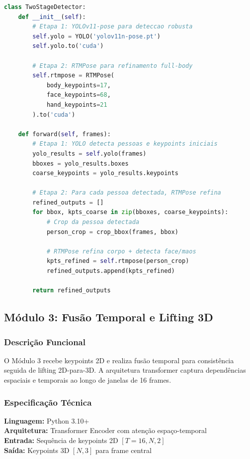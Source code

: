 \documentclass[12pt, a4paper]{article}
\begin{document}
\begin{lstlisting}[language=Python, caption=Módulo 2 - Pipeline YOLOv11 + RTMPose]
class TwoStageDetector:
    def __init__(self):
        # Etapa 1: YOLOv11-pose para deteccao robusta
        self.yolo = YOLO('yolov11n-pose.pt')
        self.yolo.to('cuda')
        
        # Etapa 2: RTMPose para refinamento full-body
        self.rtmpose = RTMPose(
            body_keypoints=17,
            face_keypoints=68,
            hand_keypoints=21
        ).to('cuda')
        
    def forward(self, frames):
        # Etapa 1: YOLO detecta pessoas e keypoints iniciais
        yolo_results = self.yolo(frames)
        bboxes = yolo_results.boxes
        coarse_keypoints = yolo_results.keypoints
        
        # Etapa 2: Para cada pessoa detectada, RTMPose refina
        refined_outputs = []
        for bbox, kpts_coarse in zip(bboxes, coarse_keypoints):
            # Crop da pessoa detectada
            person_crop = crop_bbox(frames, bbox)
            
            # RTMPose refina corpo + detecta face/maos
            kpts_refined = self.rtmpose(person_crop)
            refined_outputs.append(kpts_refined)
        
        return refined_outputs
\end{lstlisting}

\subsection{Módulo 3: Fusão Temporal e Lifting 3D}

\subsubsection{Descrição Funcional}

O Módulo 3 recebe keypoints 2D e realiza fusão temporal para consistência seguida de lifting 2D-para-3D. A arquitetura transformer captura dependências espaciais e temporais ao longo de janelas de 16 frames.

\subsubsection{Especificação Técnica}

\textbf{Linguagem:} Python 3.10+\\
\textbf{Arquitetura:} Transformer Encoder com atenção espaço-temporal\\
\textbf{Entrada:} Sequência de keypoints 2D $[T=16, N, 2]$\\
\textbf{Saída:} Keypoints 3D $[N, 3]$ para frame central
\end{document}
